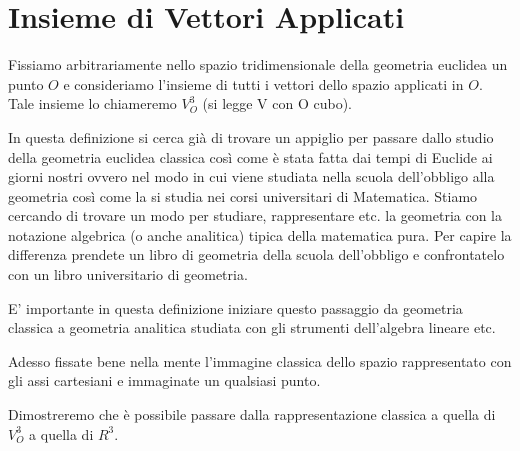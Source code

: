 \section{Insieme di Vettori Applicati}
\begin{definizione}
Fissiamo arbitrariamente nello spazio tridimensionale della geometria euclidea un punto $O$ e consideriamo l'insieme di tutti i vettori dello spazio 
applicati in $O$. Tale insieme lo chiameremo $V_{O}^{3}$ (si legge V con O cubo).
\end{definizione}

\begin{osservazione}
In questa definizione si cerca già di trovare un appiglio per passare dallo studio della geometria euclidea classica così come è stata
fatta dai tempi di Euclide ai giorni nostri ovvero nel modo in cui viene studiata nella scuola dell'obbligo alla geometria così come la
si studia nei corsi universitari di Matematica. Stiamo cercando di trovare un modo per studiare, rappresentare etc. la geometria con 
la notazione algebrica (o anche analitica) tipica della matematica pura. Per capire la differenza prendete un libro di geometria della
scuola dell'obbligo e confrontatelo con un libro universitario di geometria.

E' importante in questa definizione iniziare questo passaggio da geometria classica a geometria analitica studiata con gli strumenti
dell'algebra lineare etc.

Adesso fissate bene nella mente l'immagine classica dello spazio rappresentato con gli assi cartesiani e immaginate un qualsiasi punto.

Dimostreremo che è possibile passare dalla rappresentazione classica a quella di $V_{O}^{3}$ a quella di $R^3$.
\end{osservazione}



